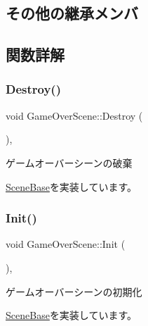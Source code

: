 \subsection*{その他の継承メンバ}


\subsection{関数詳解}
\mbox{\label{class_game_over_scene_a439e4c515c9549abd6eb45f2a3d115fa}} 
\subsubsection{\texorpdfstring{Destroy()}{Destroy()}}
{\footnotesize\ttfamily void Game\+Over\+Scene\+::\+Destroy (\begin{DoxyParamCaption}{ }\end{DoxyParamCaption})\hspace{0.3cm}{\ttfamily [final]}, {\ttfamily [virtual]}}



ゲームオーバーシーンの破棄 



\mbox{\hyperlink{class_scene_base_a7c5b54020bc519b4dadfe9770d6b27f7}{Scene\+Base}}を実装しています。

\mbox{\label{class_game_over_scene_a7382331efb2eda768c093f66395655d7}} 
\subsubsection{\texorpdfstring{Init()}{Init()}}
{\footnotesize\ttfamily void Game\+Over\+Scene\+::\+Init (\begin{DoxyParamCaption}{ }\end{DoxyParamCaption})\hspace{0.3cm}{\ttfamily [final]}, {\ttfamily [virtual]}}



ゲームオーバーシーンの初期化 



\mbox{\hyperlink{class_scene_base_a24d7db43c819924dc8b07b436f6d3148}{Scene\+Base}}を実装しています。

